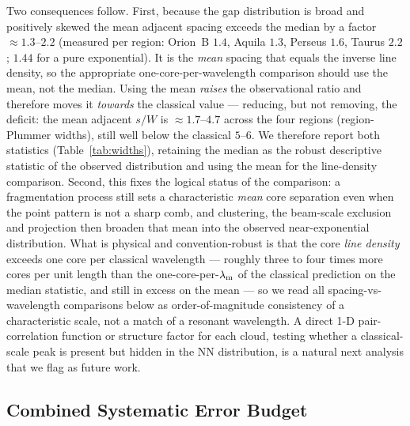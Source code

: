 \documentclass[usenatbib,twoside,twocolumn]{mnras}
\begin{document}
Two consequences follow. First, because the gap distribution is broad and positively skewed the mean adjacent spacing exceeds the median by a factor $\approx1.3$--$2.2$ (measured per region: Orion~B $1.4$, Aquila $1.3$, Perseus $1.6$, Taurus $2.2$; $1.44$ for a pure exponential). It is the \emph{mean} spacing that equals the inverse line density, so the appropriate one-core-per-wavelength comparison should use the mean, not the median. Using the mean \emph{raises} the observational ratio and therefore moves it \emph{towards} the classical value --- reducing, but not removing, the deficit: the mean adjacent $s/W$ is $\approx1.7$--$4.7$ across the four regions (region-Plummer widths), still well below the classical $5$--$6$. We therefore report both statistics (Table~\ref{tab:widths}), retaining the median as the robust descriptive statistic of the observed distribution and using the mean for the line-density comparison. Second, this fixes the logical status of the comparison: a fragmentation process still sets a characteristic \emph{mean} core separation even when the point pattern is not a sharp comb, and clustering, the beam-scale exclusion and projection then broaden that mean into the observed near-exponential distribution. What is physical and convention-robust is that the core \emph{line density} exceeds one core per classical wavelength --- roughly three to four times more cores per unit length than the one-core-per-$\lambda_{\rm m}$ of the classical prediction on the median statistic, and still in excess on the mean --- so we read all spacing-vs-wavelength comparisons below as order-of-magnitude consistency of a characteristic scale, not a match of a resonant wavelength. A direct 1-D pair-correlation function or structure factor for each cloud, testing whether a classical-scale peak is present but hidden in the NN distribution, is a natural next analysis that we flag as future work.

\subsection{Combined Systematic Error Budget}
\label{sec:error_budget}
\end{document}
